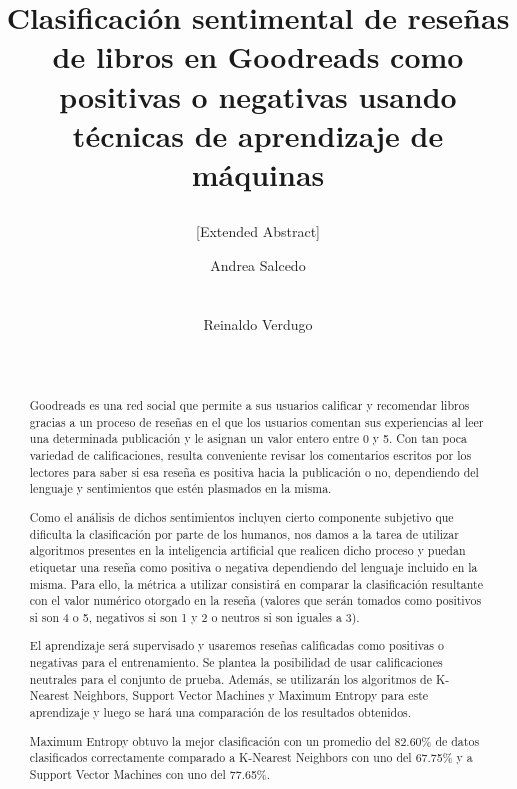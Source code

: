\documentclass[hidelinks]{sig-alternate-05-2015}
\begin{document}

\title{Clasificación sentimental de reseñas de libros en Goodreads como positivas o negativas usando técnicas de aprendizaje de máquinas
\subtitle{[Extended Abstract]
}}


\author{
\alignauthor
Andrea Salcedo\\
       \\
       \\
\alignauthor
Reinaldo Verdugo\\
       \\
       \\
}

\maketitle
\begin{abstract}

Goodreads es una red social que permite a sus usuarios calificar y recomendar libros gracias a un proceso de reseñas en el que los usuarios comentan sus experiencias al leer una determinada publicación y le asignan un valor entero entre 0 y 5. Con tan poca variedad de calificaciones, resulta conveniente revisar los comentarios escritos por los lectores para saber si esa reseña es positiva hacia la publicación o no, dependiendo del lenguaje y sentimientos que estén plasmados en la misma. 

Como el análisis de dichos sentimientos incluyen cierto componente subjetivo que dificulta la clasificación por parte de los humanos, nos damos a la tarea de utilizar algoritmos presentes en la inteligencia artificial que realicen dicho proceso y puedan etiquetar una reseña como positiva o negativa dependiendo del lenguaje incluido en la misma. Para ello, la métrica a utilizar consistirá en comparar la clasificación resultante con el valor numérico otorgado en la reseña (valores que serán tomados como positivos si son 4 o 5, negativos si son 1 y 2 o neutros si son iguales a 3). 

El aprendizaje será supervisado y usaremos reseñas calificadas como positivas o negativas para el entrenamiento. Se plantea la posibilidad de usar calificaciones neutrales para el conjunto de prueba. Además, se utilizarán los algoritmos de K-Nearest Neighbors, Support Vector Machines y Maximum Entropy para este aprendizaje y luego se hará una comparación de los resultados obtenidos.

Maximum Entropy obtuvo la mejor clasificación con un promedio del 82.60\% de datos clasificados correctamente comparado a K-Nearest Neighbors con uno del 67.75\% y a Support Vector Machines con uno del 77.65\%.

\end{abstract}
\end{document}
